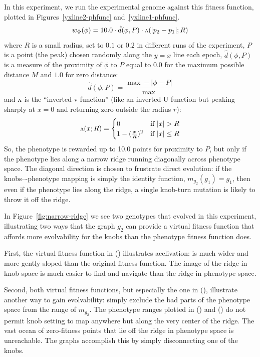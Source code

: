 \documentclass[letterpaper]{article}
\newcommand{\invv}{\ensuremath{\rotatebox[origin=c]{180}{\textrm{v}}}\xspace}
\begin{document}
In this experiment, we run the experimental genome against this fitness
function, plotted in Figures~\ref{yxline2-phfunc} and~\ref{yxline1-phfunc}.
\[
   w_\Phi(\phi) = 10.0 \cdot \hat{d}(\phi, P) \cdot \invv(|p_2 - p_1|; R)
\]
where
$R$ is a small radius, set to $0.1$ or $0.2$ in different runs of the
experiment,
$P$ is a point (the peak) chosen randomly along the $y=x$ line each epoch,
$\hat{d}(\phi, P)$ is a measure of the proximity of $\phi$ to $P$ equal to
$0.0$ for the maximum possible distance $M$ and $1.0$ for zero distance:
\[
\hat{d}(\phi, P) = \frac{\max - |\phi - P|}{\max}
\]
and \invv is the ``inverted-v function'' (like an inverted-U function but
peaking sharply at $x=0$ and returning zero outside the radius $r$):
\[
   \invv(x; R) =
   \begin{cases}
      0 & \text{if } |x|>R \\
      1 - (\frac{x}{R})^2 &
      \text{if } |x|\leq R
   \end{cases}
\]
So, the phenotype is rewarded up to 10.0 points for proximity to $P$, but only
if the phenotype lies along a narrow ridge running diagonally across phenotype
space. The diagonal direction is chosen to frustrate direct evolution: if the
knobs–-phenotype mapping is simply the identity function, $m_{g_2}(g_1)=g_1$,
then even if the phenotype lies along the ridge, a single knob-turn mutation
is likely to throw it off the ridge.

In Figure~\ref{fig:narrow-ridge} we see two genotypes that evolved in this
experiment, illustrating two ways that the graph $g_2$ can provide a virtual
fitness function that affords more evolvability for the knobs than the
phenotype fitness function does.

First, the virtual fitness function in () illustrates
acclivation: is much wider and more gently sloped than the original fitness
function. The image of the ridge in knob-space is much easier to find and
navigate than the ridge in phenotype-space.

Second, both virtual fitness functions, but especially the one in
(), illustrate another way to gain evolvability:
simply exclude the bad parts of the phenotype space from the range of
$m_{g_2}$. The phenotype ranges plotted in ()
and ()
do not permit  knob setting to map anywhere but along the very
center of the ridge. The vast ocean of zero-fitness points that lie off the
ridge in phenotype space is unreachable. The graphs accomplish this by simply
disconnecting one of the knobs.
\end{document}
